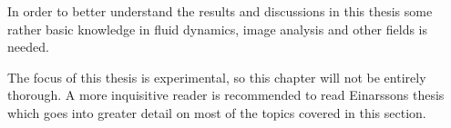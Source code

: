 In order to better understand the results and discussions in this thesis some rather basic knowledge in fluid dynamics, image analysis and other fields is needed. 

The focus of this thesis is experimental, so this chapter will not be entirely thorough. A more inquisitive reader is recommended to read Einarssons thesis~\cite{JonasThesis} which goes into greater detail on most of the topics covered in this section.
